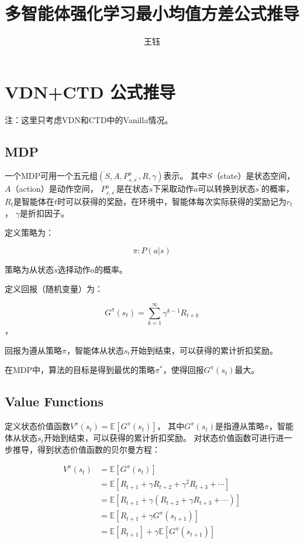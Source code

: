 \documentclass[UTF8]{ctexart}
\title{多智能体强化学习最小均值方差公式推导}
\begin{document}
\maketitle
\author{王钰}


\section{VDN+CTD 公式推导}

注：这里只考虑VDN和CTD中的Vanilla情况。

\subsection{MDP}

一个MDP可用一个五元组$(S, A, P^a_{s, s^{\prime}}, R, \gamma)$表示。
其中$S$（state）是状态空间，$A$（action）是动作空间，
$P^a_{s, s^{\prime}}$是在状态$s$下采取动作$a$可以转换到状态$s^{\prime}$的概率，
$R_t$是智能体在$t$时可以获得的奖励，在环境中，智能体每次实际获得的奖励记为$r_t$，
$\gamma$是折扣因子。

定义策略为：

$$\pi:P(a|s)$$

策略为从状态$s$选择动作$a$的概率。

定义回报（随机变量）为：

$$G^{\pi}(s_t) = \sum_{k=1}^{\infty} \gamma^{k-1} R_{t+k}$$，

回报为遵从策略$\pi$，智能体从状态$s_t$开始到结束，可以获得的累计折扣奖励。

在MDP中，算法的目标是得到最优的策略$\pi^*$，使得回报$G^{\pi}(s_t)$最大。

\subsection{Value Functions}

定义状态价值函数$V^{\pi}(s_t) = \mathbb{E}[G^{\pi}(s_t)]$，
其中$G^{\pi}(s_t)$是指遵从策略$\pi$，智能体从状态$s_t$开始到结束，可以获得的累计折扣奖励。
对状态价值函数可进行进一步推导，得到状态价值函数的贝尔曼方程：

\begin{align*}
	V^{\pi}(s_t) &= \mathbb{E}[G^{\pi}(s_t)]  \\
	&= \mathbb{E}[R_{t+1} + \gamma R_{t+2} + \gamma^2 R_{t+3} + \cdots]  \\
	&= \mathbb{E}[R_{t+1} + \gamma (R_{t+2} + \gamma R_{t+3} + \cdots)]  \\
	&= \mathbb{E}[R_{t+1} + \gamma G^{\pi}(s_{t+1})] \\
	&= \mathbb{E}[R_{t+1}] + \gamma \mathbb{E}[G^{\pi}(s_{t+1})] \\
\end{align*}
\end{document}

